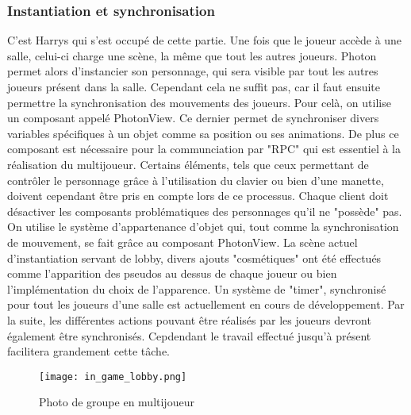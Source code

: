     \subsubsection{Instantiation et synchronisation}
        C'est Harrys qui s'est occupé de cette partie. Une fois que le joueur accède à une salle, celui-ci charge une scène, la même que tout les autres joueurs. Photon permet alors d'instancier son personnage, qui sera visible par tout les autres joueurs présent dans la salle.
        Cependant cela ne suffit pas, car il faut ensuite permettre la synchronisation des mouvements des joueurs. Pour celà, on utilise un composant appelé PhotonView. Ce dernier permet de synchroniser divers variables spécifiques à un objet comme sa position ou ses animations. De plus ce composant est nécessaire pour la communciation par "RPC" qui est essentiel à la réalisation du multijoueur.
        Certains éléments, tels que ceux permettant de contrôler le personnage grâce à l'utilisation du clavier ou bien d'une manette, doivent cependant être pris en compte lors de ce processus. Chaque client doit désactiver les composants problématiques des personnages qu'il ne "possède" pas. On utilise le système d'appartenance d'objet qui, tout comme la synchronisation de mouvement, se fait grâce au composant PhotonView.
        La scène actuel d'instantiation servant de lobby, divers ajouts "cosmétiques" ont été effectués comme l'apparition des pseudos au dessus de chaque joueur ou bien l'implémentation du choix de l'apparence.
        Un système de "timer", synchronisé pour tout les joueurs d'une salle est actuellement en cours de développement.
        Par la suite, les différentes actions pouvant être réalisés par les joueurs devront également être synchronisés. Cepdendant le travail effectué jusqu'à présent facilitera grandement cette tâche.
        
        \begin{figure}[!hbt]
                \centering \texttt{[image: in\_game\_lobby.png]} 
                \caption{Photo de groupe en multijoueur}
            \end{figure}
